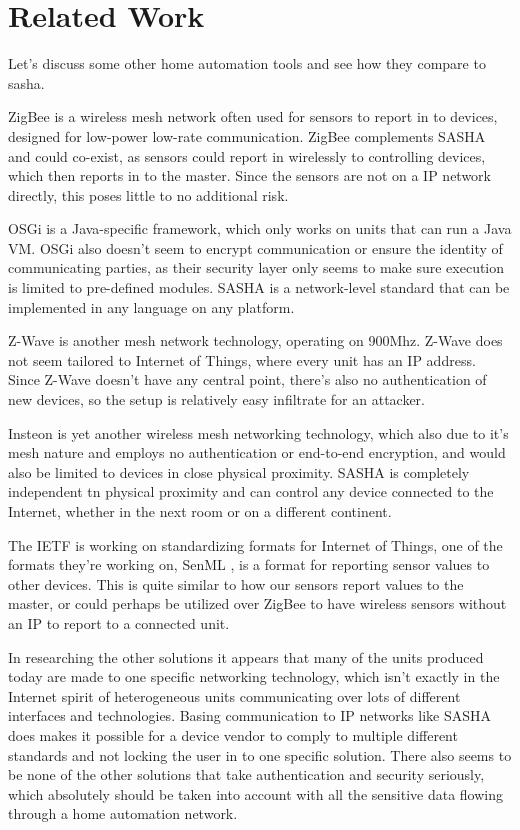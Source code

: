 \section{Related Work}

Let’s discuss some other home automation tools and see how they compare to sasha.

ZigBee\cite{zigbee} is a wireless mesh network often used for sensors to report in to devices, designed for low-power low-rate communication. ZigBee complements SASHA and could co-exist, as sensors could report in wirelessly to controlling devices, which then reports in to the master. Since the sensors are not on a IP network directly, this poses little to no additional risk.

OSGi\cite{osgi} is a Java-specific framework, which only works on units that can run a Java VM. OSGi also doesn’t seem to encrypt communication or ensure the identity of communicating parties, as their security layer only seems to make sure execution is limited to pre-defined modules. SASHA is a network-level standard that can be implemented in any language on any platform.

Z-Wave\cite{z-wave} is another mesh network technology, operating on 900Mhz. Z-Wave does not seem tailored to Internet of Things, where every unit has an IP address. Since Z-Wave doesn’t have any central point, there’s also no authentication of new devices, so the setup is relatively easy infiltrate for an attacker.

Insteon is yet another wireless mesh networking technology, which also due to it’s mesh nature and employs no authentication or end-to-end encryption, and would also be limited to devices in close physical proximity. SASHA is completely independent tn physical proximity and can control any device connected to the Internet, whether in the next room or on a different continent.

The IETF is working on standardizing formats for Internet of Things, one of the formats they’re working on, SenML \cite{senml}, is a format for reporting sensor values to other devices. This is quite similar to how our sensors report values to the master, or could perhaps be utilized over ZigBee to have wireless sensors without an IP to report to a connected unit.

In researching the other solutions it appears that many of the units produced today are made to one specific networking technology, which isn’t exactly in the Internet spirit of heterogeneous units communicating over lots of different interfaces and technologies. Basing communication to IP networks like SASHA does makes it possible for a device vendor to comply to multiple different standards and not locking the user in to one specific solution. There also seems to be none of the other solutions that take authentication and security seriously, which absolutely should be taken into account with all the sensitive data flowing through a home automation network.

